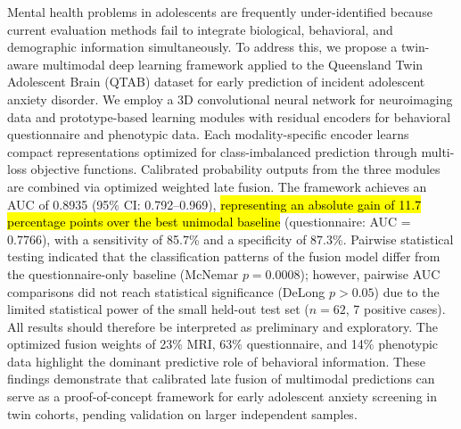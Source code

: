 \documentclass[10pt,letterpaper]{article}
\begin{document}
Mental health problems in adolescents are frequently under-identified because current evaluation methods fail to integrate biological, behavioral, and demographic information simultaneously. To address this, we propose a twin-aware multimodal deep learning framework applied to the Queensland Twin Adolescent Brain (QTAB) dataset for early prediction of incident adolescent anxiety disorder. We employ a 3D convolutional neural network for neuroimaging data and prototype-based learning modules with residual encoders for behavioral questionnaire and phenotypic data. Each modality-specific encoder learns compact representations optimized for class-imbalanced prediction through multi-loss objective functions. Calibrated probability outputs from the three modules are combined via optimized weighted late fusion. The framework achieves an AUC of 0.8935 (95\% CI: 0.792--0.969), \hl{representing an absolute gain of 11.7 percentage points over the best unimodal baseline} (questionnaire: AUC = 0.7766), with a sensitivity of 85.7\% and a specificity of 87.3\%. Pairwise statistical testing indicated that the classification patterns of the fusion model differ from the questionnaire-only baseline (McNemar $p = 0.0008$); however, pairwise AUC comparisons did not reach statistical significance (DeLong $p > 0.05$) due to the limited statistical power of the small held-out test set ($n = 62$, 7 positive cases). All results should therefore be interpreted as preliminary and exploratory. The optimized fusion weights of 23\% MRI, 63\% questionnaire, and 14\% phenotypic data highlight the dominant predictive role of behavioral information. These findings demonstrate that calibrated late fusion of multimodal predictions can serve as a proof-of-concept framework for early adolescent anxiety screening in twin cohorts, pending validation on larger independent samples.






        \linenumbers
\end{document}
